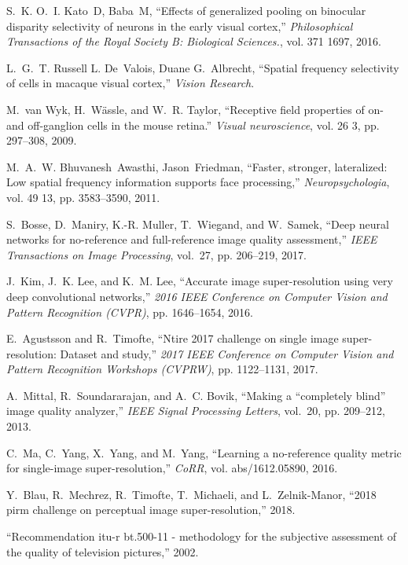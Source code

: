 \documentclass[10pt,twocolumn,letterpaper]{article}
\begin{document}
{\begin{thebibliography}{10}
S.~K. O.~I. Kato~D, Baba~M, ``Effects of generalized pooling on binocular
  disparity selectivity of neurons in the early visual cortex,''
  \emph{Philosophical Transactions of the Royal Society B: Biological
  Sciences.}, vol. 371 1697, 2016.

L.~G.~T. Russell L. De~Valois, Duane G.~Albrecht, ``Spatial frequency
  selectivity of cells in macaque visual cortex,'' \emph{Vision Research}.

M.~van Wyk, H.~W{\"a}ssle, and W.~R. Taylor, ``Receptive field properties of
  on- and off-ganglion cells in the mouse retina.'' \emph{Visual neuroscience},
  vol. 26 3, pp. 297--308, 2009.

M.~A.~W. Bhuvanesh~Awasthi, Jason~Friedman, ``Faster, stronger, lateralized:
  Low spatial frequency information supports face processing,''
  \emph{Neuropsychologia}, vol. 49 13, pp. 3583--3590, 2011.

S.~Bosse, D.~Maniry, K.-R. Muller, T.~Wiegand, and W.~Samek, ``Deep neural
  networks for no-reference and full-reference image quality assessment,''
  \emph{IEEE Transactions on Image Processing}, vol.~27, pp. 206--219, 2017.

J.~Kim, J.~K. Lee, and K.~M. Lee, ``Accurate image super-resolution using very
  deep convolutional networks,'' \emph{2016 IEEE Conference on Computer Vision
  and Pattern Recognition (CVPR)}, pp. 1646--1654, 2016.

E.~Agustsson and R.~Timofte, ``Ntire 2017 challenge on single image
  super-resolution: Dataset and study,'' \emph{2017 IEEE Conference on Computer
  Vision and Pattern Recognition Workshops (CVPRW)}, pp. 1122--1131, 2017.

A.~Mittal, R.~Soundararajan, and A.~C. Bovik, ``Making a “completely blind”
  image quality analyzer,'' \emph{IEEE Signal Processing Letters}, vol.~20, pp.
  209--212, 2013.

C.~Ma, C.~Yang, X.~Yang, and M.~Yang, ``Learning a no-reference quality metric
  for single-image super-resolution,'' \emph{CoRR}, vol. abs/1612.05890, 2016.

Y.~Blau, R.~Mechrez, R.~Timofte, T.~Michaeli, and L.~Zelnik-Manor, ``2018 pirm
  challenge on perceptual image super-resolution,'' 2018.

``Recommendation itu-r bt.500-11 - methodology for the subjective assessment of
  the quality of television pictures,'' 2002.
  

\end{thebibliography}}
\end{document}
